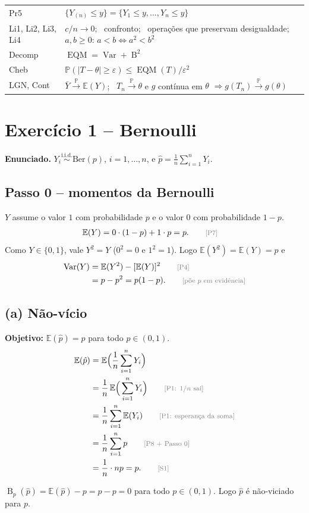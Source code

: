\documentclass[11pt,a4paper]{article}
\newcommand{\E}{\mathbb{E}}
\newcommand{\Var}{\operatorname{Var}}
\newcommand{\EQM}{\operatorname{EQM}}
\newcommand{\B}{\operatorname{B}}
\newcommand{\Prob}{\mathbb{P}}
\newcommand{\iid}{\overset{\text{i.i.d.}}{\sim}}
\newcommand{\convP}{\xrightarrow{\;\Prob\;}}
\newcommand{\bY}{\bar{Y}}
\newcommand{\just}[1]{\tag*{\footnotesize\textcolor{gray}{[#1]}}}
\begin{document}
\begin{center}
\begin{tabular}{@{}ll@{}}
Pr5 & $\{Y_{(n)}\le y\}=\{Y_1\le y,\dots,Y_n\le y\}$\\
Li1, Li2, Li3, Li4 & $c/n\to0$; \ confronto; \ operações que preservam desigualdade; \ $a,b\ge0$: $a<b\iff a^2<b^2$\\
Decomp & $\EQM=\Var+\B^2$\\
Cheb & $\Prob(|T-\theta|\ge\varepsilon)\le\EQM(T)/\varepsilon^2$\\
LGN, Cont & $\bY\convP\E(Y)$; \ $T_n\convP\theta$ e $g$ contínua em $\theta$ $\Rightarrow g(T_n)\convP g(\theta)$\\
\bottomrule
\end{tabular}
\end{center}

\section{Exercício 1 -- Bernoulli}

\textbf{Enunciado.} $Y_i\iid\text{Ber}(p)$, $i=1,\dots,n$, e $\hat p=\frac1n\sum_{i=1}^nY_i$.

\subsection*{Passo 0 -- momentos da Bernoulli}
$Y$ assume o valor $1$ com probabilidade $p$ e o valor $0$ com probabilidade $1-p$.
\begin{align*}
\E(Y)&=0\cdot(1-p)+1\cdot p=p . \just{P7}
\end{align*}
Como $Y\in\{0,1\}$, vale $Y^2=Y$ ($0^2=0$ e $1^2=1$). Logo $\E(Y^2)=\E(Y)=p$ e
\begin{align*}
\Var(Y)&=\E(Y^2)-[\E(Y)]^2 \just{P4}\\
&=p-p^2=p(1-p). \just{põe $p$ em evidência}
\end{align*}

\subsection*{(a) Não-vício}
\textbf{Objetivo:} $\E(\hat p)=p$ para todo $p\in(0,1)$.
\begin{align*}
\E(\hat p)&=\E\Big(\frac1n\sum_{i=1}^nY_i\Big)\\
&=\frac1n\,\E\Big(\sum_{i=1}^nY_i\Big) \just{P1: $1/n$ sai}\\
&=\frac1n\sum_{i=1}^n\E(Y_i) \just{P1: esperança da soma}\\
&=\frac1n\sum_{i=1}^np \just{P8 + Passo 0}\\
&=\frac1n\cdot np=p . \just{S1}
\end{align*}
\begin{resposta}
$\B_p(\hat p)=\E(\hat p)-p=p-p=0$ para todo $p\in(0,1)$. Logo $\hat p$ é não-viciado para $p$.
\end{resposta}
\end{document}
